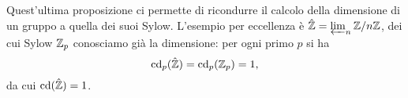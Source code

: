 Quest'ultima proposizione ci permette di ricondurre il calcolo della dimensione di un gruppo a quella dei suoi Sylow. L'esempio per eccellenza è $ \hat{\mathbb{Z}} = \varprojlim_n \mathbb{Z}/n\mathbb{Z} $, dei cui Sylow $ \mathbb{Z}_p$ conosciamo già la dimensione: per ogni primo $ p $ si ha
\[ \operatorname{cd}_p(\hat{\mathbb{Z}}) = \operatorname{cd}_p(\mathbb{Z}_p) = 1, \]
da cui $ \operatorname{cd}(\hat{\mathbb{Z}})=1 $.
